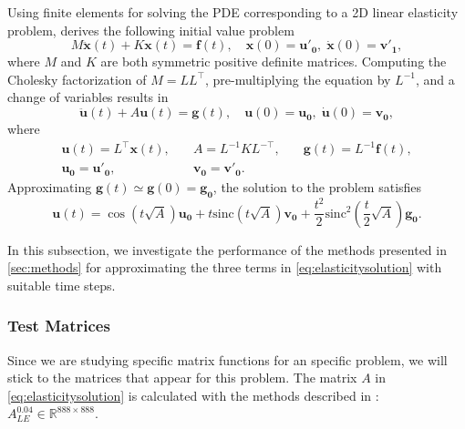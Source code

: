 Using finite elements for solving the PDE corresponding to a 2D linear elasticity problem,
\cite{voet2020linearelasticity} derives the following initial value problem
\begin{equation*}
    M \mathbf{\ddot{x}}(t) + K \mathbf{x}(t) = \mathbf{f}(t), \quad
    \mathbf{x}(0) = \mathbf{u'_0}, \; \mathbf{\dot{x}}(0) = \mathbf{v'_1},
\end{equation*}
where $M$ and $K$ are both symmetric positive definite matrices.
Computing the Cholesky factorization of $M = LL^{\top}$, pre-multiplying the equation by $L^{-1}$,
and a change of variables results in
\begin{equation}
    \mathbf{\ddot{u}}(t) + A \mathbf{u}(t) = \mathbf{g}(t), \quad
    \mathbf{u}(0) = \mathbf{u_0}, \; \mathbf{\dot{u}}(0) = \mathbf{v_0},
\end{equation}
where
\begin{equation*}
    \begin{aligned}
        & \mathbf{u}(t) = L^{\top} \mathbf{x}(t), \quad & A = L^{-1} K L^{-\top}, \quad & \mathbf{g}(t) = L^{-1} \mathbf{f}(t), & \\
        & \mathbf{u_0} = \mathbf{u'_0}, & \mathbf{v_0} = \mathbf{v'_0}. & &
    \end{aligned}
\end{equation*}
Approximating $\mathbf{g}(t) \simeq \mathbf{g}(0) = \mathbf{g_0}$, the solution to
the problem satisfies
\begin{equation}
    \label{eq:elasticitysolution}
    \mathbf{u}(t) = \cos(t\sqrt{A}) \mathbf{u_0}
    + t \mathrm{sinc}(t\sqrt{A}) \mathbf{v_0}
    + \frac{t^2}{2} \mathrm{sinc}^2(\frac{t}{2} \sqrt{A}) \mathbf{g_0}.
\end{equation}

In this subsection, we investigate the performance of the methods presented in \autoref{sec:methods}
for approximating the three terms in \eqref{eq:elasticitysolution} with suitable time steps.

\subsubsection*{Test Matrices}
Since we are studying specific matrix functions for an specific problem, we will stick to the
matrices that appear for this problem. The matrix $A$ in \eqref{eq:elasticitysolution} is
calculated with the methods described in \cite{voet2020linearelasticity}:
$A_{LE}^{0.04} \in \mathbb{R}^{888\times888}$.

